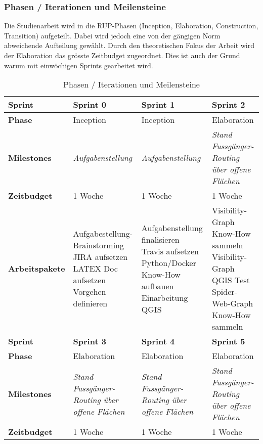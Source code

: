 \subsubsection{Phasen / Iterationen und Meilensteine}
\label{sub:Phasen / Iterationen und Meilensteine}

Die Studienarbeit wird in die \acs{RUP}-Phasen (Inception, Elaboration, Construction, Transition) aufgeteilt. Dabei wird jedoch eine von der gängigen Norm abweichende Aufteilung gewählt. Durch den theoretischen Fokus der Arbeit wird der Elaboration das grösste Zeitbudget zugeordnet. Dies ist auch der Grund warum mit einwöchigen Sprints gearbeitet wird.

\begin{table}[]
	\centering
	\caption{Phasen / Iterationen und Meilensteine}
	\begin{tabularx}{\textwidth}{lXXX}
		\toprule
		\textbf{Sprint}        & \textbf{Sprint 0} & \textbf{Sprint 1} & \textbf{Sprint 2} \\ \midrule
		\textbf{Phase}         & Inception         & Inception         & Elaboration \\
		\textbf{Milestones}    & \textit{Aufgabenstellung}  & \textit{Aufgabenstellung}  & \textit{Stand Fussgänger-Routing über offene Flächen} \\
		\textbf{Zeitbudget}    & 1 Woche           & 1 Woche           & 1 Woche                                 \\
		\textbf{Arbeitspakete} & \nextitem Aufgabestellung-Brainstorming \nextitem JIRA aufsetzen \nextitem LATEX Doc aufsetzen \nextitem Vorgehen definieren              &  \nextitem Aufgabenstellung finalisieren \nextitem Travis aufsetzen \nextitem Python/Docker Know-How aufbauen \nextitem Einarbeitung QGIS            & \nextitem Visibility-Graph Know-How sammeln \nextitem Visibility-Graph QGIS Test \nextitem Spider-Web-Graph Know-How sammeln                                  \\ \bottomrule
		\toprule
		\textbf{Sprint}        & \textbf{Sprint 3} & \textbf{Sprint 4} & \textbf{Sprint 5} \\ \midrule
		\textbf{Phase}         & Elaboration         & Elaboration         & Elaboration \\
		\textbf{Milestones}    & \textit{Stand Fussgänger-Routing über offene Flächen}  & \textit{Stand Fussgänger-Routing über offene Flächen}  & \textit{Stand Fussgänger-Routing über offene Flächen} \\
		\textbf{Zeitbudget}    & 1 Woche           & 1 Woche           & 1 Woche                                 \\

\end{tabularx}
\end{table}
